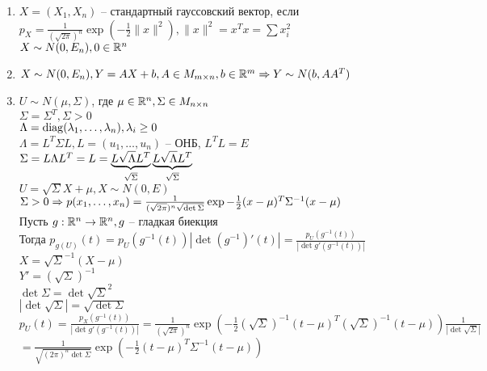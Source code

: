 \documentclass[12pt]{article}
\begin{document}
\begin{enumerate}
    \item $X = (X_1, X_n)$ -- стандартный гауссовский вектор, если $p_X = \frac1{(\sqrt{2\pi})^n} \exp(-\frac12 \|x\|^2), \|x\|^2 = x^Tx = \sum x_i^2$\\
    $X \sim N(0, E_n), 0 \in \mathbb{R}^n$
    \item $X \sim N(0, E_n), Y = AX + b, A \in M_{m\times n}, b \in \mathbb{R}^m \Rightarrow Y \sim N(b, AA^T)$
    \item $U \sim N(\mu, \Sigma)$, где $\mu \in \mathbb{R}^n, \Sigma \in M_{n\times n}$\\
    $\Sigma = \Sigma^T, \Sigma > 0$\\
    $\Lambda = \operatorname{diag}(\lambda_1, \ldots, \lambda_n), \lambda_i \geq 0$\\
    $\Lambda = L^T \Sigma L, L = (u_1, \ldots, u_n)$ -- ОНБ, $L^TL = E$\\
    $\Sigma = L\Lambda L^T = L = \underbrace{L \sqrt{\Lambda} L^T}_{\sqrt{\Sigma}} \underbrace{L \sqrt{\Lambda}L^T}_{\sqrt{\Sigma}}$\\
    $U = \sqrt{\Sigma}X + \mu, X \sim N(0, E)$\\
    $\Sigma > 0 \Rightarrow p(x_1, \ldots, x_n) = \frac1{(\sqrt{2\pi})^n \sqrt{\det \Sigma}} \exp{-\frac12 (x-\mu)^T \Sigma^{-1} (x-\mu)}$\\
    Пусть $g:\mathbb{R}^n \rightarrow \mathbb{R}^n, g$ -- гладкая биекция\\
    Тогда $p_{g(U)}(t) = p_U(g^{-1}(t))|\det (g^{-1})'(t)| = \frac{p_U(g^{-1}(t))}{|\det g'(g^{-1}(t))|}$\\
    $X=\sqrt{\Sigma}^{-1}(X-\mu)$\\
    $Y' = (\sqrt{\Sigma})^{-1}$\\
    $\det \Sigma = \det \sqrt{\Sigma}^2$\\
    $|\det \sqrt{\Sigma}| = \sqrt{\det \Sigma}$\\
    $p_U(t) = \frac{p_X(g^{-1}(t))}{|\det g'(g^{-1}(t))|} = \frac{1}{(\sqrt{2\pi})^n} \exp(-\frac12 (\sqrt{\Sigma})^{-1}(t-\mu)^T(\sqrt{\Sigma})^{-1}(t-\mu)) \frac{1}{|\det \sqrt{\Sigma}|}$\\
    $= \frac1{\sqrt{(2\pi)^n \det \Sigma}}\exp(-\frac12 (t-\mu)^T \Sigma^{-1} (t-\mu))$
\end{enumerate}
\end{document}
